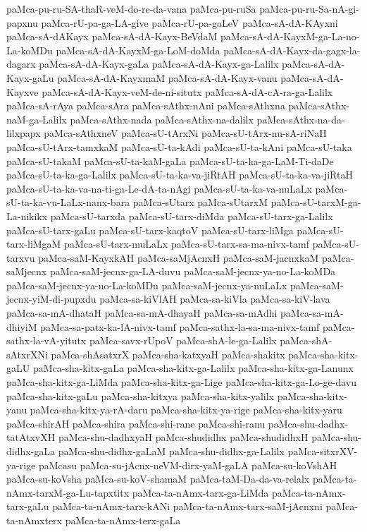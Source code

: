 {paMca-pu-ru-SA-thaR-veM-do-re-da-vana
paMca-pu-ruSa
paMca-pu-ru-Sa-nA-gi-papxnu
paMca-rU-pa-ga-LA-give
paMca-rU-pa-gaLeV
paMca-sA-dA-KAyxni
paMca-sA-dAKayx
paMca-sA-dA-Kayx-BeVdaM
paMca-sA-dA-KayxM-ga-La-no-La-koMDu
paMca-sA-dA-KayxM-ga-LoM-doMda
paMca-sA-dA-Kayx-da-gagx-la-dagarx
paMca-sA-dA-Kayx-gaLa
paMca-sA-dA-Kayx-ga-Lalilx
paMca-sA-dA-Kayx-gaLu
paMca-sA-dA-KayxmaM
paMca-sA-dA-Kayx-vanu
paMca-sA-dA-Kayxve
paMca-sA-dA-Kayx-veM-de-ni-situtx
paMca-sA-dA-cA-ra-ga-Lalilx
paMca-sA-rAya
paMca-sAra
paMca-sAthx-nAni
paMca-sAthxna
paMca-sAthx-naM-ga-Lalilx
paMca-sAthx-nada
paMca-sAthx-na-dalilx
paMca-sAthx-na-da-lilxpapx
paMca-sAthxneV
paMca-sU-tArxNi
paMca-sU-tArx-nu-sA-riNaH
paMca-sU-tArx-tamxkaM
paMca-sU-ta-kAdi
paMca-sU-ta-kAni
paMca-sU-taka
paMca-sU-takaM
paMca-sU-ta-kaM-gaLa
paMca-sU-ta-ka-ga-LaM-Ti-daDe
paMca-sU-ta-ka-ga-Lalilx
paMca-sU-ta-ka-va-jiRtAH
paMca-sU-ta-ka-va-jiRtaH
paMca-sU-ta-ka-va-na-ti-ga-Le-dA-ta-nAgi
paMca-sU-ta-ka-va-nuLaLx
paMca-sU-ta-ka-vu-LaLx-nanx-bara
paMca-sUtarx
paMca-sUtarxM
paMca-sU-tarxM-ga-La-nikikx
paMca-sU-tarxda
paMca-sU-tarx-diMda
paMca-sU-tarx-ga-Lalilx
paMca-sU-tarx-gaLu
paMca-sU-tarx-kaqtoV
paMca-sU-tarx-liMga
paMca-sU-tarx-liMgaM
paMca-sU-tarx-muLaLx
paMca-sU-tarx-sa-ma-nivx-tamf
paMca-sU-tarxvu
paMca-saM-KayxkAH
paMca-saMjAcnxH
paMca-saM-jacnxkaM
paMca-saMjecnx
paMca-saM-jecnx-ga-LA-duvu
paMca-saM-jecnx-ya-no-La-koMDa
paMca-saM-jecnx-ya-no-La-koMDu
paMca-saM-jecnx-ya-nuLaLx
paMca-saM-jecnx-yiM-di-pupxdu
paMca-sa-kiVlAH
paMca-sa-kiVla
paMca-sa-kiV-lava
paMca-sa-mA-dhataH
paMca-sa-mA-dhayaH
paMca-sa-mAdhi
paMca-sa-mA-dhiyiM
paMca-sa-patx-ka-lA-nivx-tamf
paMca-sathx-la-sa-ma-nivx-tamf
paMca-sathx-la-vA-yitutx
paMca-savx-rUpoV
paMca-shA-le-ga-Lalilx
paMca-shA-sAtxrXNi
paMca-shAsatxrX
paMca-sha-katxyaH
paMca-shakitx
paMca-sha-kitx-gaLU
paMca-sha-kitx-gaLa
paMca-sha-kitx-ga-Lalilx
paMca-sha-kitx-ga-Lanunx
paMca-sha-kitx-ga-LiMda
paMca-sha-kitx-ga-Lige
paMca-sha-kitx-ga-Lo-ge-davu
paMca-sha-kitx-gaLu
paMca-sha-kitxya
paMca-sha-kitx-yalilx
paMca-sha-kitx-yanu
paMca-sha-kitx-ya-rA-daru
paMca-sha-kitx-ya-rige
paMca-sha-kitx-yaru
paMca-shirAH
paMca-shira
paMca-shi-rane
paMca-shi-ranu
paMca-shu-dadhx-tatAtxvXH
paMca-shu-dadhxyaH
paMca-shudidhx
paMca-shudidhxH
paMca-shu-didhx-gaLa
paMca-shu-didhx-gaLaM
paMca-shu-didhx-ga-Lalilx
paMca-sitxrXV-ya-rige
paMcasu
paMca-su-jAcnx-neVM-dirx-yaM-gaLA
paMca-su-koVshAH
paMca-su-koVsha
paMca-su-koV-shamaM
paMca-taM-Da-da-va-relalx
paMca-ta-nAmx-tarxM-ga-Lu-tapxtitx
paMca-ta-nAmx-tarx-ga-LiMda
paMca-ta-nAmx-tarx-gaLu
paMca-ta-nAmx-tarx-kANi
paMca-ta-nAmx-tarx-saM-jAcnxni
paMca-ta-nAmxterx
paMca-ta-nAmx-terx-gaLa
}
